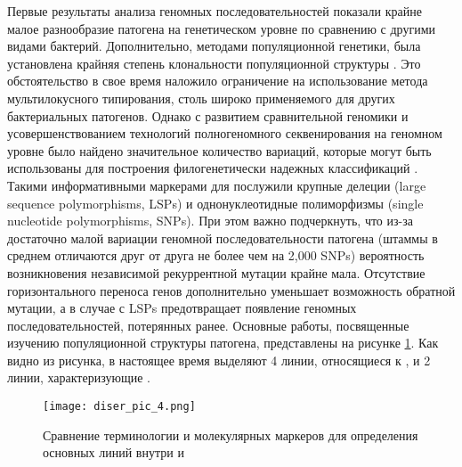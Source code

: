 Первые результаты анализа геномных последовательностей  показали крайне малое разнообразие патогена на генетическом уровне по сравнению с другими видами бактерий. Дополнительно, методами популяционной генетики, была установлена крайняя степень клональности популяционной структуры \cite{sreevatsan1997restricted, ramaswamy1998molecular, hirsh2004stable}. Это обстоятельство в свое время наложило ограничение на использование метода мультилокусного типирования, столь широко применяемого для других бактериальных патогенов. Однако с развитием сравнительной геномики и усовершенствованием технологий полногеномного секвенирования на геномном уровне было найдено значительное количество вариаций, которые могут быть использованы для построения филогенетически надежных классификаций \cite{gagneux2007global}. Такими информативными маркерами для  послужили крупные делеции (large sequence polymorphisms, LSPs) и однонуклеотидные полиморфизмы (single nucleotide polymorphisms, SNPs). При этом важно подчеркнуть, что из-за достаточно малой вариации геномной последовательности патогена (штаммы в среднем отличаются друг от друга не более чем на 2,000 SNPs) вероятность возникновения независимой рекуррентной мутации крайне мала. Отсутствие горизонтального переноса генов дополнительно уменьшает возможность обратной мутации, а в случае с LSPs предотвращает появление геномных последовательностей, потерянных ранее. Основные работы, посвященные изучению популяционной структуры патогена, представлены на рисунке \ref{diser_pic_4}. Как видно из рисунка, в настоящее время выделяют 4 линии, относящиеся к , и 2 линии, характеризующие .

\begin{figure}[h!]
    \begin{center}
        \texttt{[image: diser\_pic\_4.png]}
    \end{center}
\caption[foo bar]{Сравнение терминологии и молекулярных маркеров для определения основных линий внутри  и }
\label{diser_pic_4}
\end{figure}


